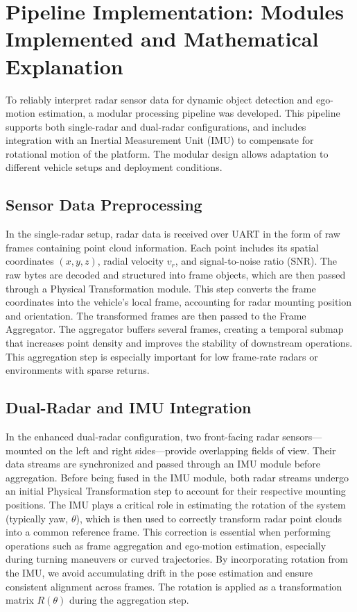 
\section{Pipeline Implementation: Modules Implemented and Mathematical Explanation}
\label{sec:Mathematical Models and Algorithms for Radar-Based Object Detection}

To reliably interpret radar sensor data for dynamic object detection and ego-motion estimation, a modular processing pipeline was developed. 
This pipeline supports both single-radar and dual-radar configurations, and includes integration with an Inertial Measurement Unit (IMU) to compensate for rotational motion of the platform. 
The modular design allows adaptation to different vehicle setups and deployment conditions.

\subsection*{Sensor Data Preprocessing}
In the single-radar setup, radar data is received over UART in the form of raw frames containing point cloud information. 
Each point includes its spatial coordinates $(x, y, z)$, radial velocity $v_r$, and signal-to-noise ratio (SNR). 
The raw bytes are decoded and structured into frame objects, which are then passed through a Physical Transformation module. 
This step converts the frame coordinates into the vehicle's local frame, accounting for radar mounting position and orientation. 
The transformed frames are then passed to the Frame Aggregator.
The aggregator buffers several frames, creating a temporal submap that increases point density and improves the stability of downstream operations. 
This aggregation step is especially important for low frame-rate radars or environments with sparse returns.

\subsection*{Dual-Radar and IMU Integration}
In the enhanced dual-radar configuration, two front-facing radar sensors—mounted on the left and right sides—provide overlapping fields of view. 
Their data streams are synchronized and passed through an IMU module before aggregation.
Before being fused in the IMU module, both radar streams undergo an initial Physical Transformation step to account for their respective mounting positions.
The IMU plays a critical role in estimating the rotation of the system (typically yaw, $\theta$), which is then used to correctly transform radar point clouds into a common reference frame. 
This correction is essential when performing operations such as frame aggregation and ego-motion estimation, especially during turning maneuvers or curved trajectories.
By incorporating rotation from the IMU, we avoid accumulating drift in the pose estimation and ensure consistent alignment across frames. 
The rotation is applied as a transformation matrix $R(\theta)$ during the aggregation step.

